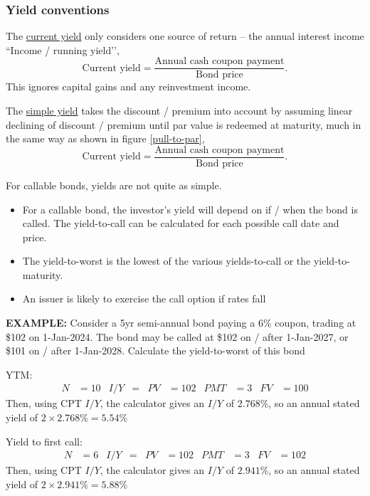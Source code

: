 \documentclass[../notes_compiled.tex]{subfiles}
\begin{document}
\subsubsection{Yield conventions}
\begin{itemize}
\item The \underline{current yield} only considers one source of return -- the annual interest income ``Income / running yield’’,
\begin{equation}
\text{Current yield} = \frac{\text{Annual cash coupon payment}}{\text{Bond price}}.
\end{equation}
This ignores capital gains and any reinvestment income.
\item The \underline{simple yield} takes the discount / premium into account by assuming linear declining of discount / premium until par value is redeemed at maturity, much in the same way as shown in figure \ref{pull-to-par},
\begin{equation}
\text{Current yield} = \frac{\text{Annual cash coupon payment}}{\text{Bond price}}.
\end{equation}
\item For callable bonds, yields are not quite as simple.
\begin{itemize}
\item For a callable bond, the investor’s yield will depend on if / when the bond is called. The yield-to-call can be calculated for each possible call date and price.
\item The yield-to-worst is the lowest of the various yields-to-call or the yield-to-maturity.
\item[] An issuer is likely to exercise the call option if rates fall
\end{itemize}
{\color{RedViolet}
\item[] \textbf{EXAMPLE:} Consider a 5yr semi-annual bond paying a 6\% coupon, trading at \$102 on 1-Jan-2024. The bond may be called at \$102 on / after 1-Jan-2027, or \$101 on / after 1-Jan-2028. Calculate the yield-to-worst of this bond
}
{\color{RoyalBlue}
\item[] YTM:
\begin{align*}
N&=10  & I / Y &=  & PV &=102 & PMT &=3 & FV &= 100
\end{align*}
Then, using CPT $I / Y$, the calculator gives an $I / Y$ of $2.768\%$, so an annual stated yield of $2\times 2.768\% = 5.54\%$

\item[] Yield to first call:
\begin{align*}
N&=6  & I / Y &=  & PV &=102 & PMT &=3 & FV &= 102
\end{align*}
Then, using CPT $I / Y$, the calculator gives an $I / Y$ of $2.941\%$, so an annual stated yield of $2\times 2.941\% = 5.88\%$

}
\end{itemize}
\end{document}
